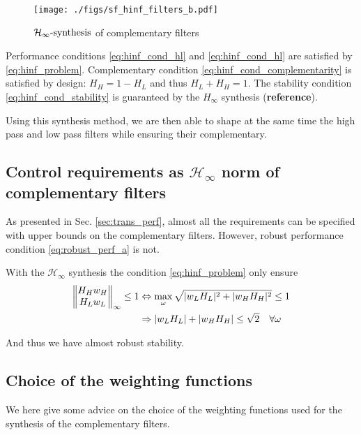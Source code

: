 \documentclass[9pt, technote, a4paper]{ieeeconf}
\begin{document}
\begin{figure}[htbp]
\centering
\texttt{[image: ./figs/sf\_hinf\_filters\_b.pdf]}
\caption{\label{fig:sf_hinf_filters_b}
\(\mathcal{H}_\infty\text{-synthesis}\) of complementary filters}
\end{figure}

Performance conditions \eqref{eq:hinf_cond_hl} and \eqref{eq:hinf_cond_hl} are satisfied by \eqref{eq:hinf_problem}.
Complementary condition \eqref{eq:hinf_cond_complementarity} is satisfied by design: \(H_H = 1 - H_L\) and thus \(H_L + H_H = 1\).
The stability condition \eqref{eq:hinf_cond_stability} is guaranteed by the \(H_\infty\) synthesis (\textbf{reference}).


Using this synthesis method, we are then able to shape at the same time the high pass and low pass filters while ensuring their complementary.

\subsection{Control requirements as \(\mathcal{H}_\infty\) norm of complementary filters}
\label{sec:org6b171b3}
As presented in Sec. \ref{sec:trans_perf}, almost all the requirements can be specified with upper bounds on the complementary filters.
However, robust performance condition \eqref{eq:robust_perf_a} is not.

With the \(\mathcal{H}_\infty\) synthesis the condition \eqref{eq:hinf_problem} only ensure
\begin{align*}
  \left\|\begin{matrix} H_H w_H \\ H_L w_L \end{matrix}\right\|_{\infty} \le 1 &\Leftrightarrow \max_\omega \sqrt{|w_L H_L|^2 + |w_H H_H|^2} \le 1\\
                                                             &\Rightarrow |w_L H_L| + |w_H H_H| \le \sqrt{2} \quad \forall\omega
\end{align*}

And thus we have almost robust stability.

\subsection{Choice of the weighting functions}
\label{sec:orgced69fd}
   \label{sec:hinf_weighting_func}
We here give some advice on the choice of the weighting functions used for the synthesis of the complementary filters.
\end{document}

